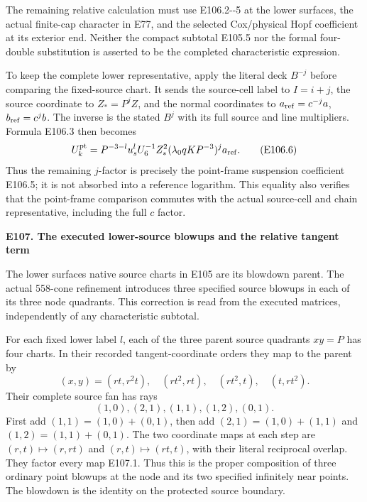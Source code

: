 The remaining relative calculation must use E106.2-\/-5 at the lower surfaces, the actual finite-cap character in E77, and the selected Cox/physical Hopf coefficient at its exterior end. Neither the compact subtotal E105.5 nor the formal four-double substitution is asserted to be the completed characteristic expression.

To keep the complete lower representative, apply the literal deck \(B^{-j}\) before comparing the fixed-source chart. It sends the source-cell label to \(I=i+j\), the source coordinate to \(Z_*=P^jZ\), and the normal coordinates to \(a_{\rm ref}=c^{-j}a\), \(b_{\rm ref}=c^jb\). The inverse is the stated \(B^j\) with its full source and line multipliers. Formula E106.3 then becomes
\[
 U_k^{\rm pt}
 =P^{-3-l}u_s^lU_6^{-1}Z_*^2
       (\lambda_0qK P^{-3})^j a_{\rm ref}.
 \tag{E106.6}
\]
Thus the remaining \(j\)-factor is precisely the point-frame suspension coefficient E106.5; it is not absorbed into a reference logarithm. This equality also verifies that the point-frame comparison commutes with the actual source-cell and chain representative, including the full \(c\) factor.

\par

\medskip\noindent\textbf{E107. The executed lower-source blowups and the relative tangent term}

\par\nobreak

The lower surface\textquotesingle s native source charts in E105 are its blowdown parent. The actual 558-cone refinement introduces three specified source blowups in each of its three node quadrants. This correction is read from the executed matrices, independently of any characteristic subtotal.

For each fixed lower label \(l\), each of the three parent source quadrants \(xy=P\) has four charts. In their recorded tangent-coordinate orders they map to the parent by
\[
 (x,y)=(rt,r^2t),\quad(rt^2,rt),\quad(rt^2,t),\quad(t,rt^2).
 \tag{E107.1}
\]
Their complete source fan has rays
\[
       (1,0),(2,1),(1,1),(1,2),(0,1).
 \tag{E107.2}
\]
First add \((1,1)=(1,0)+(0,1)\), then add \((2,1)=(1,0)+(1,1)\) and \((1,2)=(1,1)+(0,1)\). The two coordinate maps at each step are \((r,t)\mapsto(r,rt)\) and \((r,t)\mapsto(rt,t)\), with their literal reciprocal overlap. They factor every map E107.1. Thus this is the proper composition of three ordinary point blowups at the node and its two specified infinitely near points. The blowdown is the identity on the protected source boundary.

